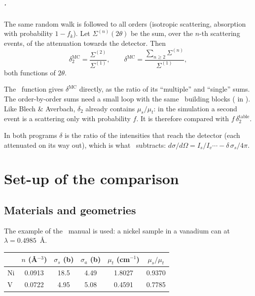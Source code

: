 \documentclass[11pt,a4paper]{report}
\begin{document}
\paragraph{\mcams.} The same random walk is followed to all orders (isotropic
scattering, absorption with probability $1-f_k$). Let $\Sigma^{(n)}(2\theta)$ be
the sum, over the $n$-th scattering events, of the attenuation towards the
detector. Then
\begin{equation}
  \delta_2^{\text{MC}} = \frac{\Sigma^{(2)}}{\Sigma^{(1)}}, \qquad
  \delta^{\text{MC}} = \frac{\sum_{n\geq 2}\Sigma^{(n)}}{\Sigma^{(1)}} ,
\end{equation}
both functions of $2\theta$.

The \mcams\ function  gives
$\delta^{\text{MC}}$ directly, as the ratio of its ``multiple'' and ``single''
sums. The
order-by-order sums need a small loop with the same \mcams\ building blocks
( in ). Like Blech \&
Averbach, $\delta_2$ already contains $\mu_s/\mu_t$: in the simulation a second
event is a scattering only with probability $f$. It is therefore compared with
$f\,\delta_2^{\text{table}}$.

\begin{note}
In both programs $\delta$ is the ratio of the intensities that reach the
detector (each attenuated on its way out), which is what \cor\ subtracts:
$d\sigma/d\Omega = I_s/I_v\cdots - \delta\,\sigma_s/4\pi$.
\end{note}

\chapter{Set-up of the comparison}

\section{Materials and geometries}

The example of the \pyc\ manual is used: a nickel sample in a vanadium can at
$\lambda = 0.4985$~\AA.

\begin{center}\small
\begin{tabular}{@{}lccccc@{}}
\toprule
 & $n$ (\AA$^{-3}$) & $\sigma_s$ (b) & $\sigma_a$ (b) & $\mu_t$ (cm$^{-1}$) & $\mu_s/\mu_t$ \\
\midrule
Ni & 0.0913 & 18.5 & 4.49 & 1.8027 & 0.9370 \\
V  & 0.0722 & 4.95 & 5.08 & 0.4591 & 0.7785 \\
\bottomrule
\end{tabular}
\end{center}
\end{document}
